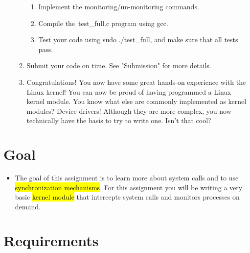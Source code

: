 \documentclass[12pt]{article}
\begin{document}
\begin{itemize}
\begin{enumerate}[1.]
\begin{enumerate}
            \item Implement the monitoring/un-monitoring commands.
            \item Compile the\ test\_full.c program using gcc.
            \item Test your code using sudo ./test\_full, and make sure that all tests pass.
        \end{enumerate}
        \item Submit your code on time. See "Submission" for more details.
        \item Congratulations! You now have some great hands-on experience with the Linux kernel! You can now be proud of having programmed a Linux kernel module. You know what else are commonly implemented as kernel modules? Device drivers! Although they are more complex, you now technically have the basis to try to write one. Isn't that cool?
    \end{enumerate}
\end{itemize}

\section{Goal}

\begin{itemize}
    \item

    The goal of this assignment is to learn more about system calls and to use
    \hl{synchronization mechanisms}. For this assignment you will be writing a very
    basic \hl{kernel module} that intercepts system calls and monitors processes on
    demand.

\end{itemize}

\section{Requirements}
\end{document}
